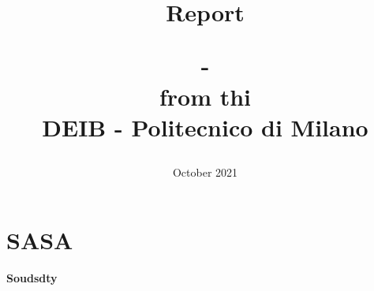 \documentclass[12pt]{article}
\begin{document}
	\title{Report\\
		\date{October 2021}
		\large{-\\}
		\large{from thi\\}
		\small{DEIB - Politecnico di Milano}
	}
	\maketitle
	\tableofcontents
	\newpage
	\section{SASA}
	\paragraph{Soudsdty}\mbox{}\\\newline
	
		
\end{document}
